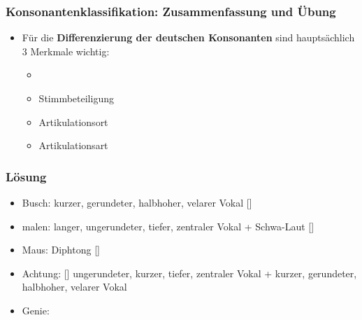 
\begin{frame}
\frametitle{Konsonantenklassifikation: Zusammenfassung und Übung}

	\begin{itemize}
		\item Für die \textbf{Differenzierung der deutschen Konsonanten} sind hauptsächlich 3 Merkmale wichtig:
		
		\begin{itemize}
			\item[]
			\item Stimmbeteiligung
			\item Artikulationsort
			\item Artikulationsart
		\end{itemize}
		
                  
	\end{itemize}
	
\end{frame}


\begin{frame}
\frametitle{Lösung}
\begin{itemize}
	\item Busch: kurzer, gerundeter, halbhoher, velarer Vokal []
	\item malen: langer, ungerundeter, tiefer, zentraler Vokal + Schwa-Laut []
	\item Maus: Diphtong []
	\item Achtung: [] ungerundeter, kurzer, tiefer, zentraler Vokal + kurzer, gerundeter, halbhoher, velarer Vokal
	\item Genie: 
\end{itemize}
\end{frame}



